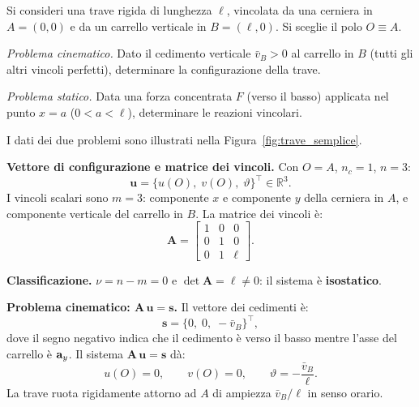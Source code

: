 \begin{esempio}
	\label{ex:trave_semplice}
	Si consideri una trave rigida di lunghezza $\ell$,
	vincolata da una cerniera in $A = (0,0)$ e da un
	carrello verticale in $B = (\ell, 0)$. Si sceglie
	il polo $O \equiv A$.
	
	\noindent\textit{Problema cinematico.} Dato il
	cedimento verticale $\bar{v}_B > 0$ al carrello in
	$B$ (tutti gli altri vincoli perfetti), determinare
	la configurazione della trave.
	
	\noindent\textit{Problema statico.} Data una forza
	concentrata $F$ (verso il basso) applicata nel punto
	$x = a$ ($0 < a < \ell$), determinare le reazioni
	vincolari.
	
	I dati dei due problemi sono illustrati nella
	Figura~\ref{fig:trave_semplice}.
	


	
	\begin{svolgimento}
		
		\noindent\textbf{Vettore di configurazione e matrice
			dei vincoli.}
		Con $O = A$, $n_c = 1$, $n = 3$:
		\begin{equation*}
			\bm{u} =
			\bigl\{u(O),\; v(O),\; \vartheta
			\bigr\}^\top \in \mathbb{R}^3.
		\end{equation*}
		I vincoli scalari sono $m = 3$: componente $x$ e
		componente $y$ della cerniera in $A$, e componente
		verticale del carrello in $B$. La matrice dei vincoli
		è:
		\begin{equation*}\label{eq:A_es1}
			\bm{A} =
			\begin{bmatrix}
				1 & 0 & 0 \\
				0 & 1 & 0 \\
				0 & 1 & \ell
			\end{bmatrix}.
		\end{equation*}
		
		\noindent\textbf{Classificazione.}
		$\nu = n - m = 0$ e $\det\bm{A} = \ell \neq 0$:
		il sistema è \textbf{isostatico}.
		
		\smallskip
		\noindent\textbf{Problema cinematico:
			$\bm{A}\,\bm{u} = \bm{s}$.}
		Il vettore dei cedimenti è:
		\begin{equation*}
			\bm{s} =
			\bigl\{0,\; 0,\; -\bar{v}_B
			\bigr\}^\top,
		\end{equation*}
		dove il segno negativo indica che il cedimento è
		verso il basso mentre l'asse del carrello è $\mathbf{a}_y$.
		Il sistema $\bm{A}\,\bm{u} = \bm{s}$ dà:
		\begin{equation*}
			u(O) = 0, \qquad v(O) = 0, \qquad
			\vartheta = -\frac{\bar{v}_B}{\ell}.
		\end{equation*}
		La trave ruota rigidamente attorno ad $A$ di ampiezza
		$\bar{v}_B/\ell$ in senso orario.
		

\end{svolgimento}
\end{esempio}
